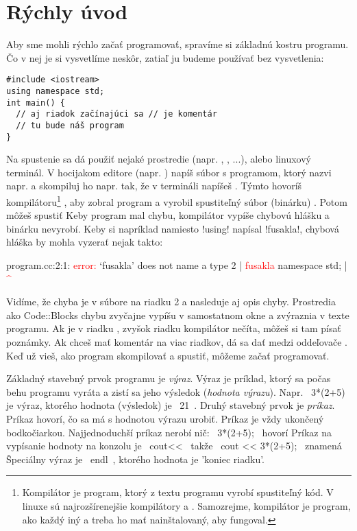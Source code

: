 \chapter{Rýchly úvod}
Aby sme mohli rýchlo začať programovať,
spravíme si základnú kostru programu. Čo v nej je si vysvetlíme neskôr, zatiaľ
ju budeme používať bez vysvetlenia:

\begin{lstlisting}
#include <iostream>
using namespace std;
int main() {
  // aj riadok začínajúci sa // je komentár
  // tu bude náš program
}
\end{lstlisting}


Na spustenie sa dá použiť nejaké prostredie (napr.
, , ...), alebo linuxový terminál.  V
hocijakom editore (napr. ) napíš súbor s
programom, ktorý nazvi napr.  a skompiluj ho napr. tak, že
v termináli napíšeš . Týmto hovoríš
kompilátoru\footnote{%
  Kompilátor je program, ktorý z textu programu vyrobí
  spustiteľný kód. V linuxe sú najrozšírenejšie kompilátory  a
  . Samozrejme, kompilátor je program, ako každý iný a treba ho mať
  nainštalovaný, aby fungoval.  } 
, aby zobral program 
a vyrobil spustiteľný súbor (binárku) . Potom môžeš spustiť
 Keby program mal chybu, kompilátor vypíše chybovú hlášku a
binárku nevyrobí.  Keby si napríklad namiesto \prg!using! napísal
\prg!fusakla!, chybová hláška by mohla vyzerať nejak takto:

\begin{outputBox}
program.cc:2:1: \textcolor{red}{error:} ‘fusakla’ does not name a type
    2 | \textcolor{red}{fusakla} namespace std;
      | \textcolor{red}{^~~~~~}
\end{outputBox}

Vidíme, že chyba je v súbore  na riadku 2 a nasleduje aj opis chyby.
Prostredia ako Code::Blocks chybu zvyčajne vypíšu v samostatnom okne a zvýraznia v texte
programu. Ak je v riadku \vb{//}, zvyšok riadku kompilátor nečíta, môžeš si tam písať poznámky. Ak chceš mať komentár na viac riadkov, dá sa dať medzi 
oddeľovače .
Keď už vieš, ako program skompilovať a spustiť, môžeme začať programovať.

Základný stavebný prvok programu je {\em výraz}. Výraz je príklad, ktorý
sa počas behu programu vyráta a zistí sa jeho výsledok ({\em hodnota výrazu}). 
Napr. \prg~3*(2+5)~ je
výraz, ktorého hodnota (výsledok) je \prg~21~.  Druhý stavebný prvok je {\em príkaz}.
Príkaz hovorí, čo sa má s hodnotou výrazu urobiť. 
Príkaz je vždy ukončený bodkočiarkou.  Najjednoduchší
príkaz nerobí nič: \prg~3*(2+5);~ hovorí  Príkaz na vypísanie hodnoty na konzolu je \prg~cout<<~ takže
\prg~cout << 3*(2+5);~ znamená  Špeciálny výraz je \prg ~endl~, ktorého hodnota je 'koniec riadku'.

